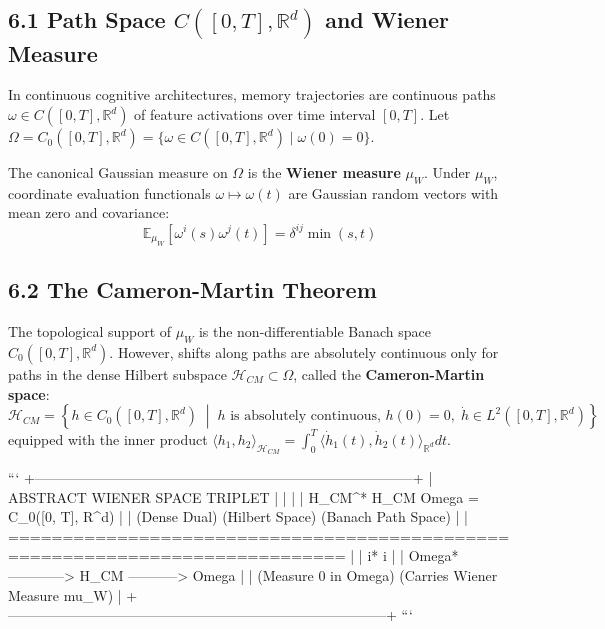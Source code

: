 \documentclass[11pt,twoside,openright]{amsbook}
\begin{document}
\subsection{6.1 Path Space $C([0, T], \mathbb{R}^d)$ and Wiener Measure}
In continuous cognitive architectures, memory trajectories are continuous paths $\omega \in C([0, T], \mathbb{R}^d)$ of feature activations over time interval $[0, T]$. Let $\Omega = C_0([0, T], \mathbb{R}^d) = \{\omega \in C([0, T], \mathbb{R}^d) \mid \omega(0) = 0\}$.

The canonical Gaussian measure on $\Omega$ is the \textbf{Wiener measure} $\mu_W$. Under $\mu_W$, coordinate evaluation functionals $\omega \mapsto \omega(t)$ are Gaussian random vectors with mean zero and covariance:
$$\mathbb{E}_{\mu_W}[\omega^i(s) \omega^j(t)] = \delta^{ij} \min(s, t)$$

\subsection{6.2 The Cameron-Martin Theorem}
The topological support of $\mu_W$ is the non-differentiable Banach space $C_0([0, T], \mathbb{R}^d)$. However, shifts along paths are absolutely continuous only for paths in the dense Hilbert subspace $\mathcal{H}_{CM} \subset \Omega$, called the \textbf{Cameron-Martin space}:
$$\mathcal{H}_{CM} = \left\{ h \in C_0([0, T], \mathbb{R}^d) \;\middle|\; h \text{ is absolutely continuous, } h(0) = 0, \; \dot{h} \in L^2([0, T], \mathbb{R}^d) \right\}$$
equipped with the inner product $\langle h_1, h_2 \rangle_{\mathcal{H}_{CM}} = \int_0^T \langle \dot{h}_1(t), \dot{h}_2(t) \rangle_{\mathbb{R}^d} dt$.

```
+---------------------------------------------------------------------------------+
|                        ABSTRACT WIENER SPACE TRIPLET                            |
|                                                                                 |
|       H_{CM}^*              H_{CM}                   Omega = C_0([0, T], R^d)   |
|     (Dense Dual)         (Hilbert Space)               (Banach Path Space)       |
|   ============================================================================= |
|          i*                    i                                                |
|   Omega* ------------> H_{CM} -----------> Omega                                |
|                        (Measure 0 in Omega) (Carries Wiener Measure mu_W)       |
+---------------------------------------------------------------------------------+
```
\end{document}
